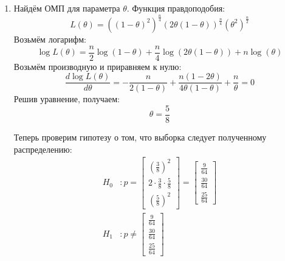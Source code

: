 \documentclass{article}
\begin{document}
\begin{enumerate}
\begin{enumerate}
\begin{lstlisting}
statistic = n * np.sum((nu / n - p0) ** 2 / p0)

print(f"Criterion statistic: {statistic:.3f}")

quantile = stats.chi2.ppf(1 - alpha, m - 1)

print(f"Quantile of Chi squared distribution: {quantile:.3f}")

if statistic > quantile:
    print("Reject the null hypothesis")
else:
    print("Reject the alternative hypothesis")
                    \end{lstlisting}

		            Вывод:
		            \begin{lstlisting}
Criterion statistic: 15.389
Quantile of Chi squared distribution: 12.592
Reject the null hypothesis
                    \end{lstlisting}
	      \end{enumerate}

	\item
	      Найдём ОМП для параметра $\theta$. Функция правдоподобия:
	      \[
		      L(\theta) = ((1 - \theta)^2)^{\frac{n}{4}} (2\theta(1 - \theta))^{\frac{n}{4}} (\theta^2)^{\frac{n}{2}}
	      \]
	      Возьмём логарифм:
	      \[
		      \log L(\theta) = \frac{n}{2} \log(1 - \theta) + \frac{n}{4} \log(2\theta(1 - \theta)) + n \log(\theta)
	      \]
	      Возьмём производную и приравняем к нулю:
	      \[
		      \frac{d \log L(\theta)}{d \theta} = -\frac{n}{2(1 - \theta)} + \frac{n(1 - 2\theta)}{4\theta(1 - \theta)} + \frac{n}{\theta} = 0
	      \]
	      Решив уравнение, получаем:
	      \[
		      \theta = \frac{5}{8}
	      \]

	      Теперь проверим гипотезу о том, что выборка следует полученному распределению:
	      \begin{equation*}
		      \begin{aligned}
			      H_0 & : p = \begin{bmatrix}
				                  \left(\frac{3}{8}\right)^2        \\[5pt]
				                  2\cdot\frac{3}{8}\cdot\frac{5}{8} \\[5pt]
				                  \left(\frac{5}{8}\right)^2
			                  \end{bmatrix} = \begin{bmatrix}
				                                  \frac{9}{64}  \\[5pt]
				                                  \frac{30}{64} \\[5pt]
				                                  \frac{25}{64}
			                                  \end{bmatrix} \\
			      H_1 & : p \neq \begin{bmatrix}
				                     \frac{9}{64}  \\[5pt]
				                     \frac{30}{64} \\[5pt]
				                     \frac{25}{64}
			                     \end{bmatrix}
		      \end{aligned}
	      \end{equation*}


\end{enumerate}
\end{document}
